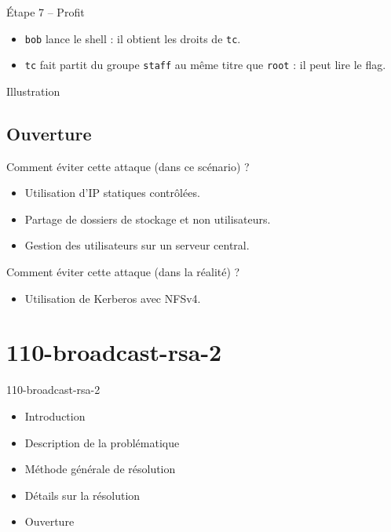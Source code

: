 \documentclass{beamer}
\begin{document}
\begin{frame}[fragile]
\begin{block}{Étape 7 -- Profit}
\begin{itemize}
\item \verb+bob+ lance le shell : il obtient les droits de
\verb+tc+.
\item \verb+tc+ fait partit du groupe \verb+staff+ au même titre que
\verb+root+ : il peut lire le flag.
\end{itemize}
\end{block}
\begin{exampleblock}{Illustration}
\begin{center}
\end{center}
\end{exampleblock}
\end{frame}

\subsection{Ouverture}
\begin{frame}
\begin{block}{Comment éviter cette attaque (dans ce scénario) ?}
\begin{itemize}
\item Utilisation d'IP statiques contrôlées.
\item Partage de dossiers de stockage et non utilisateurs.
\item Gestion des utilisateurs sur un serveur central.
\end{itemize}
\end{block}
\begin{block}{Comment éviter cette attaque (dans la réalité) ?}
\begin{itemize}
\item Utilisation de Kerberos avec NFSv4.
\end{itemize}
\end{block}
\end{frame}

	\section{110-broadcast-rsa-2}
	\begin{frame}
	\begin{block}{110-broadcast-rsa-2}
		\begin{itemize}
			\item Introduction
			\item Description de la problématique
			\item Méthode générale de résolution
			\item Détails sur la résolution
			\item Ouverture
		\end{itemize}
	\end{block}

	\end{frame}
\end{document}
